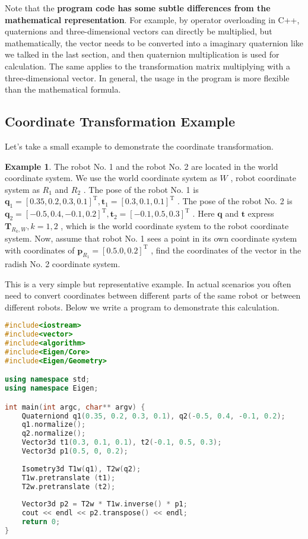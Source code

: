 Note that the \textbf {program code has some subtle differences from the mathematical representation}. For example, by operator overloading in C++, quaternions and three-dimensional vectors can directly be multiplied, but mathematically, the vector needs to be converted into a imaginary quaternion like we talked in the last section, and then quaternion multiplication is used for calculation. The same applies to the transformation matrix multiplying with a three-dimensional vector. In general, the usage in the program is more flexible than the mathematical formula.

\subsection{Coordinate Transformation Example}

Let's take a small example to demonstrate the coordinate transformation.

\noindent  \textbf{Example 1}. \quad  The robot No. 1 and the robot No. 2 are located in the world coordinate system. We use the world coordinate system as $W$ , robot coordinate system as $R_1 $ and $R_2$ . The pose of the robot No. 1 is $ \mathbf {q}_ 1 = [ 0.35 , 0.2 , 0.3 , 0.1 ]^ \mathrm{T}, \mathbf{t}_ 1 = [ 0.3 , 0.1 , 0.1 ]^ \mathrm{T} $ . The pose of the robot No. 2 is $ \mathbf{q}_2 = [ - 0.5 , 0.4 , - 0.1 , 0.2 ]^ \mathrm{T}, \mathbf{t}_ 2 = [- 0.1 , 0.5 , 0.3 ]^ \mathrm{T} $ . Here $ \mathbf {q} $ and $ \mathbf{t} $ express $ \mathbf{T}_{R_k, W}, k= 1 , 2 $ , which is the world coordinate system to the robot coordinate system. Now, assume that robot No. 1 sees a point in its own coordinate system with coordinates of $ \mathbf{p}_{R_1} = [ 0.5 .0 , 0.2 ]^ \mathrm{T} $ , find the coordinates of the vector in the radish No. 2 coordinate system. 

This is a very simple but representative example. In actual scenarios you often need to convert coordinates between different parts of the same robot or between different robots. Below we write a program to demonstrate this calculation.

\begin{lstlisting}[language=c++,caption=slambook2/ch3/examples/coordinateTransform.cpp]
#include<iostream>
#include<vector>
#include<algorithm>
#include<Eigen/Core>
#include<Eigen/Geometry>

using namespace std;
using namespace Eigen;

int main(int argc, char** argv) {
	Quaterniond q1(0.35, 0.2, 0.3, 0.1), q2(-0.5, 0.4, -0.1, 0.2);
	q1.normalize();
	q2.normalize();
	Vector3d t1(0.3, 0.1, 0.1), t2(-0.1, 0.5, 0.3);
	Vector3d p1(0.5, 0, 0.2);
	
	Isometry3d T1w(q1), T2w(q2);
	T1w.pretranslate (t1);
	T2w.pretranslate (t2);
	
	Vector3d p2 = T2w * T1w.inverse() * p1;
	cout << endl << p2.transpose() << endl;
	return 0;
}
\end{lstlisting}

